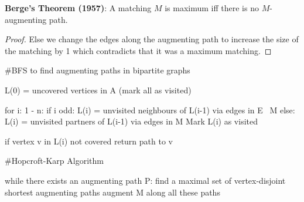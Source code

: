 \begin{theorem}
	\textbf{Berge's Theorem (1957)}: A matching $M$ is maximum iff there is no $M$-augmenting path.
\end{theorem}

\begin{proof}
	Else we change the edges along the augmenting path to increase the size of the matching by 1 which contradicts that it was a maximum matching.
\end{proof}

\begin{algorithm}
	#BFS to find augmenting paths in bipartite graphs

	L(0) = {uncovered vertices in A} (mark all as visited)

	for i: 1 - n:
	if i odd:
	L(i) = {unvisited neighbours of L(i-1) via edges in E \ M}
	else:
	L(i) = {unvisited partners of L(i-1) via edges in M}
	Mark L(i) as visited

	if vertex v in L(i) not covered
	return path to v
\end{algorithm}

\begin{algorithm}
	#Hopcroft-Karp Algorithm

	while there exists an augmenting path P:
	find a maximal set of vertex-disjoint shortest augmenting paths
	augment M along all these paths
\end{algorithm}

